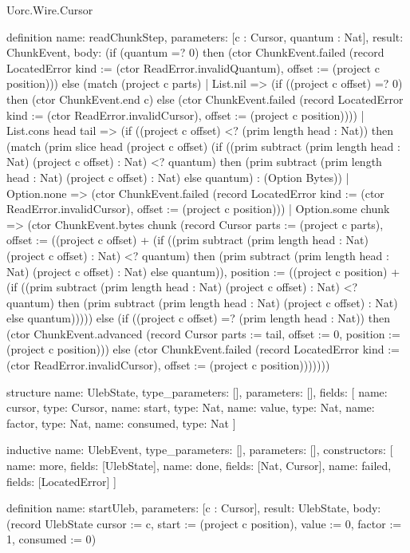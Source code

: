 \begin{lexlean}{Uorc.Wire.Cursor}
\begin{semanticmodule}
definition{
  name: readChunkStep,
  parameters: [c : Cursor, quantum : Nat],
  result: ChunkEvent,
  body: (if (quantum =? 0) then (ctor ChunkEvent.failed (record LocatedError {kind := (ctor ReadError.invalidQuantum), offset := (project c position)})) else (match (project c parts)
    | List.nil => (if ((project c offset) =? 0) then (ctor ChunkEvent.end c) else (ctor ChunkEvent.failed (record LocatedError {kind := (ctor ReadError.invalidCursor), offset := (project c position)})))
    | List.cons head tail => (if ((project c offset) <? (prim length head : Nat)) then (match (prim slice head (project c offset) (if ((prim subtract (prim length head : Nat) (project c offset) : Nat) <? quantum) then (prim subtract (prim length head : Nat) (project c offset) : Nat) else quantum) : (Option Bytes))
      | Option.none => (ctor ChunkEvent.failed (record LocatedError {kind := (ctor ReadError.invalidCursor), offset := (project c position)}))
      | Option.some chunk => (ctor ChunkEvent.bytes chunk (record Cursor {parts := (project c parts), offset := ((project c offset) + (if ((prim subtract (prim length head : Nat) (project c offset) : Nat) <? quantum) then (prim subtract (prim length head : Nat) (project c offset) : Nat) else quantum)), position := ((project c position) + (if ((prim subtract (prim length head : Nat) (project c offset) : Nat) <? quantum) then (prim subtract (prim length head : Nat) (project c offset) : Nat) else quantum))}))) else (if ((project c offset) =? (prim length head : Nat)) then (ctor ChunkEvent.advanced (record Cursor {parts := tail, offset := 0, position := (project c position)})) else (ctor ChunkEvent.failed (record LocatedError {kind := (ctor ReadError.invalidCursor), offset := (project c position)}))))))
}

structure{
  name: UlebState,
  type_parameters: [],
  parameters: [],
  fields: [
    {name: cursor, type: Cursor},
    {name: start, type: Nat},
    {name: value, type: Nat},
    {name: factor, type: Nat},
    {name: consumed, type: Nat}
  ]
}

inductive{
  name: UlebEvent,
  type_parameters: [],
  parameters: [],
  constructors: [
    {name: more, fields: [UlebState]},
    {name: done, fields: [Nat, Cursor]},
    {name: failed, fields: [LocatedError]}
  ]
}

definition{
  name: startUleb,
  parameters: [c : Cursor],
  result: UlebState,
  body: (record UlebState {cursor := c, start := (project c position), value := 0, factor := 1, consumed := 0})
}


\end{semanticmodule}
\end{lexlean}
